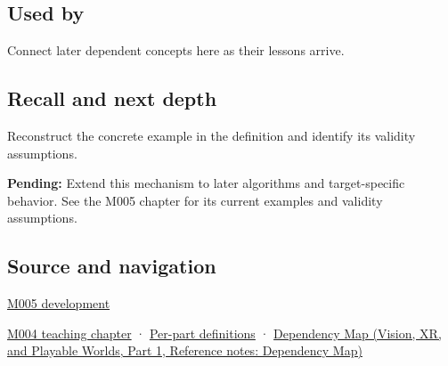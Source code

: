 \subsection{Used by}\label{appendix-ed8531b46754-used-by}

\hypertarget{appendix-ed8531b46754-used-by}{}

Connect later dependent concepts here as their lessons arrive.

\subsection{Recall and next depth}\label{appendix-ed8531b46754-recall-and-next-depth}

\hypertarget{appendix-ed8531b46754-recall-and-next-depth}{}

Reconstruct the concrete example in the definition and identify its validity assumptions.

\textbf{Pending:} Extend this mechanism to later algorithms and target-specific behavior. See the M005 chapter for its current examples and validity assumptions.

\subsection{Source and navigation}\label{appendix-ed8531b46754-source-and-navigation}

\hypertarget{appendix-ed8531b46754-source-and-navigation}{}

\hyperref[01-foundations-i-ch001-when-arithmetic-meets-uncertainty]{M005 development}

\hyperref[01-foundations-i-ch001-a-stretching-ruler-for-real-valued-quantities]{M004 teaching chapter} · \hyperref[appendix-fd090d982a15-m004---parts-61-76]{Per-part definitions} · \href{../07-Vision-XR-and-Playable-Worlds-P01/main.pdf\#nameddest=appendix-4ad47bdd269a}{Dependency Map (Vision, XR, and Playable Worlds, Part 1, Reference notes: Dependency Map)}
